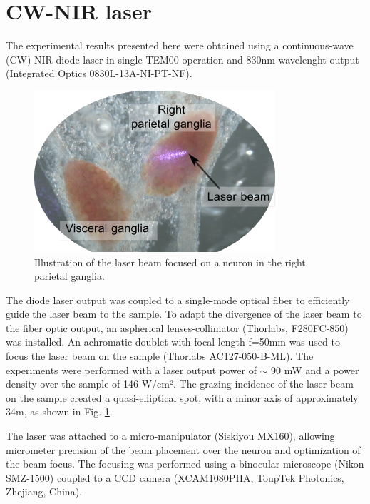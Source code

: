 \section{CW-NIR laser}
The experimental results presented here were obtained using a continuous-wave (CW) NIR diode laser in single TEM00 operation and 830nm wavelenght output (Integrated Optics 0830L-13A-NI-PT-NF). \begin{figure}
	\includegraphics{img/laser/laser-beam.pdf}
	\caption{Illustration of the laser beam focused on a neuron in the right parietal ganglia.}
	\label{fig:laser beam}
\end{figure} 
The diode laser output was coupled to a single-mode optical fiber to efficiently guide the laser beam to the sample. To adapt the divergence of the laser beam to the fiber optic output, an aspherical lenses-collimator (Thorlabs, F280FC-850) was installed. An achromatic doublet with focal length f=50mm was used to focus the laser beam on the sample (Thorlabs AC127-050-B-ML). The experiments were performed with a laser output power of $\sim$ 90 mW and a power density over the sample of 146 W/cm². The grazing incidence of the laser beam on the sample created a quasi-elliptical spot, with a minor axis of approximately 34{\textmu}m, as shown in Fig. \ref{fig:laser beam}.



The laser was attached to a micro-manipulator (Siskiyou MX160), allowing micrometer precision of the beam placement over the neuron and optimization of the beam focus. The focusing was performed using a binocular microscope (Nikon SMZ-1500) coupled to a CCD camera (XCAM1080PHA, ToupTek Photonics, Zhejiang, China).


